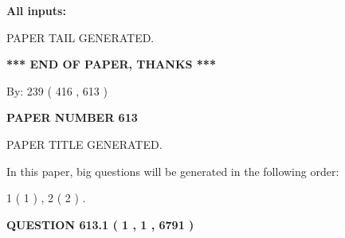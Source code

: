 \documentclass[12pt]{article}
\begin{document}
   
   
   
\noindent{}
   
   
   
   
\noindent\vspace{0.1in}\hspace{-0.08in} {\textbf{\Large{All inputs: }}}
   
   
   
   
   
   
 \vspace{0.2in}
 
   
   
\vspace{2.0in} PAPER TAIL GENERATED.
   
   
   
   
\vspace{1.0in} 
{\textbf{\large{ *** END OF PAPER, THANKS *** }}} 
   
   
\hspace{1.0in} By: 
 239 ( 416 ,  613 )
   
   
   
   
\newpage 
\setcounter{page}{ 
   613001 } 
   
   
   
   
 {\textbf{ \Large{ PAPER NUMBER  613  }}}
   
   
\vspace{0.2in}
   
   
   
   
   
   
   
   
 \vspace{0.2in}
 
 
 
 
   
   
 PAPER TITLE GENERATED.
   
   
   
\vspace{0.2in}
   
In this paper, big questions will be generated in the following order: 
   
   
   1 ( 1 )
 ,
   2 ( 2 )
 .
  
\vspace{0.2in}
  
{\textbf{\Large{QUESTION
613.1 
 ( 1 , 1 , 6791 )
}}}
  
\end{document}
